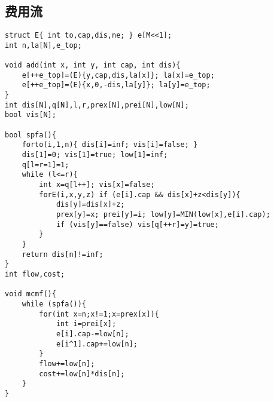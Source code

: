\documentclass{article}
\begin{document}
\subsection{费用流}
\begin{lstlisting}
struct E{ int to,cap,dis,ne; } e[M<<1];
int n,la[N],e_top;

void add(int x, int y, int cap, int dis){
	e[++e_top]=(E){y,cap,dis,la[x]}; la[x]=e_top;
	e[++e_top]=(E){x,0,-dis,la[y]}; la[y]=e_top;
}
int dis[N],q[N],l,r,prex[N],prei[N],low[N];
bool vis[N];

bool spfa(){
	forto(i,1,n){ dis[i]=inf; vis[i]=false; }
	dis[1]=0; vis[1]=true; low[1]=inf;
	q[l=r=1]=1;
	while (l<=r){
		int x=q[l++]; vis[x]=false;
		forE(i,x,y,z) if (e[i].cap && dis[x]+z<dis[y]){
			dis[y]=dis[x]+z;
			prex[y]=x; prei[y]=i; low[y]=MIN(low[x],e[i].cap);
			if (vis[y]==false) vis[q[++r]=y]=true;
		}
	}
	return dis[n]!=inf;
}
int flow,cost;

void mcmf(){
	while (spfa()){
		for(int x=n;x!=1;x=prex[x]){
			int i=prei[x];
			e[i].cap-=low[n];
			e[i^1].cap+=low[n];
		}
		flow+=low[n];
		cost+=low[n]*dis[n];
	}
}
\end{lstlisting}
\end{document}

